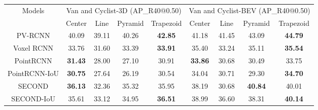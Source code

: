 \documentclass[10pt,twocolumn,letterpaper]{article}
\begin{document}
\begin{table*}[]
{\begin{tabular}{|c||c|c|c|c||c|c|c|c|}
\hline
\multirow{2}{*}{Models}          & \multicolumn{4}{c||}{ Van and Cyclist-3D  (AP\_R40@0.50)}                                          & \multicolumn{4}{c|}{Van and Cyclist-BEV (AP\_R40@0.50)}                                 \\ \cline{2-9} &
Center & Line & Pyramid & Trapezoid &
Center & Line &  Pyramid & Trapezoid \\ \hline
PV-RCNN  \cite{shi2020pv}
&	40.09 &	39.11 &	40.26 &	\textbf{42.85}
 &	41.18&	41.45&	43.09&	\textbf{44.79}
                   \\ \hline
Voxel RCNN  \cite{deng2020voxel}
&	33.76&	31.60&	33.39&	\textbf{33.91}
   &	35.40&	33.24&	35.11&	\textbf{35.54}
                   \\ \hline
PointRCNN \cite{Shi_2019_CVPR}
&	\textbf{31.43}&	28.00&	27.10&	30.91
   &	\textbf{33.86}&	30.68&	30.49&	33.75
                      \\ \hline
PointRCNN-IoU \cite{Shi_2019_CVPR}
&	\textbf{30.75}&	27.64&	26.19&	30.54
 &	34.04&	30.71&	29.30&	\textbf{34.70}
                  \\ \hline
SECOND \cite{yan2018second}
&	\textbf{36.13}&	32.36&	35.32&	35.95
 &	38.19&	30.68&	\textbf{40.84}&	40.01
                     \\ \hline
SECOND-IoU  \cite{yan2018second}
&	35.61&	33.12&	34.95&	\textbf{36.51}
&	38.99&	36.60&	38.31&	\textbf{40.14}
                        \\ \hline

\end{tabular}}
\end{table*}
\end{document}
